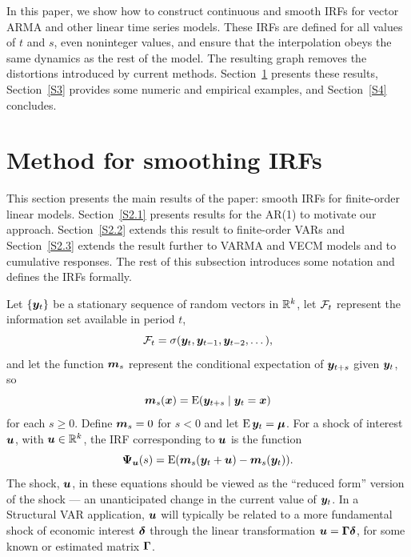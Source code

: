 \documentclass[AER,reviewmode]{tex/AEA}
\begin{document}
In this paper, we show how to construct continuous and smooth IRFs
for vector ARMA and other linear time series models. These IRFs are
defined for all values of $t$ and $s$, even noninteger values, and
ensure that the interpolation obeys the same dynamics as the rest of
the model. The resulting graph removes the distortions introduced by
current methods.  Section~\ref{S2} presents these results,
Section~\ref{S3} provides some numeric and empirical examples, and
Section~\ref{S4} concludes.

\section{Method for smoothing IRFs}
\label{S2}

\noindent%
This section presents the main results of the paper: smooth IRFs for
finite-order linear models. Section~\ref{S2.1} presents results for
the AR(1) to motivate our approach. Section~\ref{S2.2} extends this
result to finite-order VARs and Section~\ref{S2.3} extends the
result further to VARMA and VECM models and to cumulative responses.
The rest of this subsection introduces some notation and defines the
IRFs formally.

Let $\{\bm{y}_t\}$ be a stationary sequence of random vectors in $\mathbb{R}^k$,
let $\mathcal{F}_t$ represent the information set available in period $t$,
\begin{equation*}
  \mathcal{F}_t = \sigma(\bm{y}_t, \bm{y}_{t-1}, \bm{y}_{t-2},\dots),
\end{equation*}
and let the function $\bm{m}_s$ represent the conditional expectation of
$\bm{y}_{t+s}$ given $\bm{y}_t$, so
\begin{equation*}
  \bm{m}_s(\bm{x}) = \operatorname{E}(\bm{y}_{t+s} \mid \bm{y}_t = \bm{x})
\end{equation*}
for each $s \geq 0$. Define $\bm{m}_s = 0$ for $s < 0$ and let
$\operatorname{E} \bm{y}_t = \bm{\mu}$. For a shock of interest $\bm{u}$, with $\bm{u} \in \mathbb{R}^k$, the
IRF corresponding to $\bm{u}$ is the function
\begin{equation}
  \label{eq:16}
  \bm{\Psi}_{\bm{u}}(s) = \operatorname{E}(\bm{m}_s(\bm{y}_t + \bm{u}) - \bm{m}_s(\bm{y}_t)).
\end{equation}
The shock, $\bm{u}$, in these equations should be viewed as the ``reduced
form'' version of the shock --- an unanticipated change in the current
value of $\bm{y}_t$. In a Structural VAR application, $\bm{u}$ will typically
be related to a more fundamental shock of economic interest $\bm{\delta}$
through the linear transformation $\bm{u} = \bm{\Gamma} \bm{\delta}$, for some known
or estimated matrix $\bm{\Gamma}$.
\end{document}
